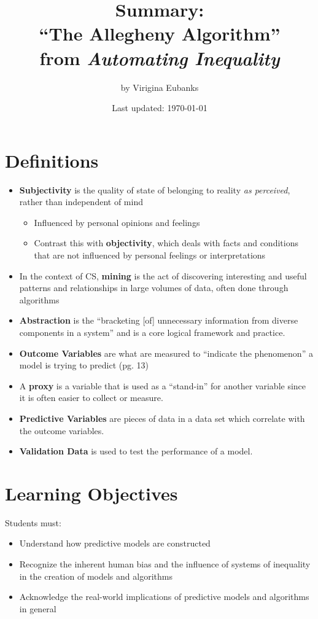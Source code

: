 \documentclass{article}
\title{\textbf{Summary:}\\``The Allegheny Algorithm''\\from \textit{Automating Inequality}}
\author{by Virigina Eubanks}
\date{Last updated: \today}
\begin{document}
\maketitle

\tableofcontents
\newpage

\section{Definitions}
    \begin{itemize}
        \item \textbf{Subjectivity} is the quality of state of belonging to reality \textit{as perceived}, rather than independent of mind
        \begin{itemize}
            \item Influenced by personal opinions and feelings
            \item Contrast this with \textbf{objectivity}, which deals with facts and conditions that are not influenced by personal feelings or interpretations
        \end{itemize}
        \item In the context of CS, \textbf{mining} is the act of discovering interesting and useful patterns and relationships in large volumes of data, often done through algorithms
        \item \textbf{Abstraction} is the “bracketing [of] unnecessary information from diverse components in a system” and is a core logical framework and practice. 
        \item \textbf{Outcome Variables} are what are measured to “indicate the phenomenon” a model is trying to predict (pg. 13)
        \item A \textbf{proxy} is a variable that is used as a “stand-in” for another variable since it is often easier to collect or measure.
        \item \textbf{Predictive Variables} are pieces of data in a data set which correlate with the outcome variables.
        \item \textbf{Validation Data} is used to test the performance of a model.
    \end{itemize}


\section{Learning Objectives}
    Students must:
    \begin{itemize}
        \item Understand how predictive models are constructed
        \item Recognize the inherent human bias and the influence of systems of inequality in the creation of models and algorithms
        \item Acknowledge the real-world implications of predictive models and algorithms in general
    \end{itemize}
\end{document}
